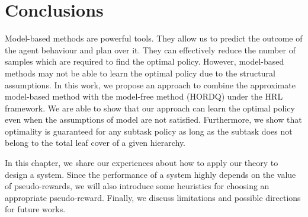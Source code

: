\chapter{Conclusions}


Model-based methods are powerful tools. They allow us to predict the outcome 
of the agent behaviour and plan over it. They can effectively reduce the number of 
samples which are required to find the optimal policy.
However, model-based methods may not be able to learn the optimal
policy due to the structural assumptions.
In this work, we propose an approach to combine the approximate model-based method with the
model-free method (HORDQ) under the HRL framework. We are able to show that our approach
can learn the optimal policy even when the assumptions of model are not satisfied. Furthermore, we show that optimality
is guaranteed for any subtask policy as long as the subtask does not belong to the total leaf
cover of a given hierarchy.


In this chapter, we share our experiences about how to apply our theory to design a system.
Since the performance of a system highly depends on the value of pseudo-rewards, we will also introduce
some heuristics for choosing an appropriate pseudo-reward.
Finally, we discuss limitations and possible directions for future works. 

